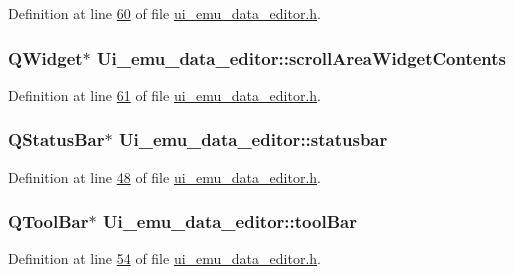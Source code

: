 Definition at line \hyperlink{a00051_source_l00060}{60} of file \hyperlink{a00051_source}{ui\+\_\+emu\+\_\+data\+\_\+editor.\+h}.

\hypertarget{a00026_a2fd25ae1a2b71980cbe9b9ba2751da3b}{
\subsubsection[{scroll\+Area\+Widget\+Contents}]{\setlength{\rightskip}{0pt plus 5cm}Q\+Widget$\ast$ Ui\+\_\+emu\+\_\+data\+\_\+editor\+::scroll\+Area\+Widget\+Contents}}\label{a00026_a2fd25ae1a2b71980cbe9b9ba2751da3b}


Definition at line \hyperlink{a00051_source_l00061}{61} of file \hyperlink{a00051_source}{ui\+\_\+emu\+\_\+data\+\_\+editor.\+h}.

\hypertarget{a00026_ab06a6e9bb964fc017cb9a246ee1f9ecb}{
\subsubsection[{statusbar}]{\setlength{\rightskip}{0pt plus 5cm}Q\+Status\+Bar$\ast$ Ui\+\_\+emu\+\_\+data\+\_\+editor\+::statusbar}}\label{a00026_ab06a6e9bb964fc017cb9a246ee1f9ecb}


Definition at line \hyperlink{a00051_source_l00048}{48} of file \hyperlink{a00051_source}{ui\+\_\+emu\+\_\+data\+\_\+editor.\+h}.

\hypertarget{a00026_a884ecf47fc47f20bd60e9406b1ef88f1}{
\subsubsection[{tool\+Bar}]{\setlength{\rightskip}{0pt plus 5cm}Q\+Tool\+Bar$\ast$ Ui\+\_\+emu\+\_\+data\+\_\+editor\+::tool\+Bar}}\label{a00026_a884ecf47fc47f20bd60e9406b1ef88f1}


Definition at line \hyperlink{a00051_source_l00054}{54} of file \hyperlink{a00051_source}{ui\+\_\+emu\+\_\+data\+\_\+editor.\+h}.

